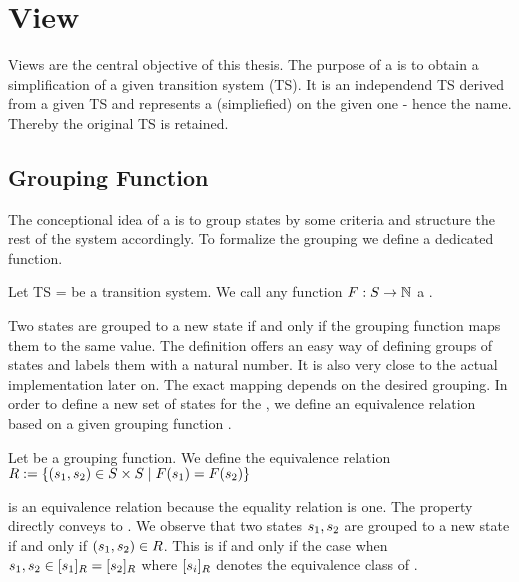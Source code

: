 \documentclass[preview]{standalone}
\begin{document}
\section{View}
Views are the central objective of this thesis. The purpose of a \viewN is to obtain a simplification of a given transition system (TS).  It is an independend TS derived from a given TS and represents a (simpliefied) \viewN on the given one - hence the name. Thereby the original TS is retained. 

\subsection{Grouping Function}



The conceptional idea of a \viewN is to group states by some criteria and structure the rest of the system accordingly. To formalize the grouping we define a dedicated function.

\begin{definition}
	Let TS = \transitionsystem be a transition system. We call any function $F : S \rightarrow \mathbb{N}$ a \emph{\grpfctN}.
	
	\label{def:grpfct}
\end{definition}


Two states are grouped to a new state if and only if the grouping function maps them to the same value. The definition offers an easy way of defining groups of states and labels them with a natural number. It is also very close to the actual implementation later on. The exact mapping depends on the desired grouping. In order to define a new set of states for the \viewN, we define an equivalence relation \eqrelview based on a given grouping function \grpfct.

\begin{definition}
	Let \grpfct be a grouping function. We define the equivalence relation $R :=\{ (s_1, s_2) \in S \times S \mid F(s_1) = F(s_2)\}$
	
	\label{def:R}
\end{definition}

\eqrelview is an equivalence relation because the equality relation is one. The property directly conveys to \eqrelview. We observe that two states $s_1, s_2$ are grouped to a new state if and only if $(s_1, s_2) \in R$. This is if and only if the case when $s_1, s_2 \in [s_1]_{R} = [s_2]_{R}$ where $[s_i]_{R}$ denotes the equivalence class of \eqrelview.
\end{document}
